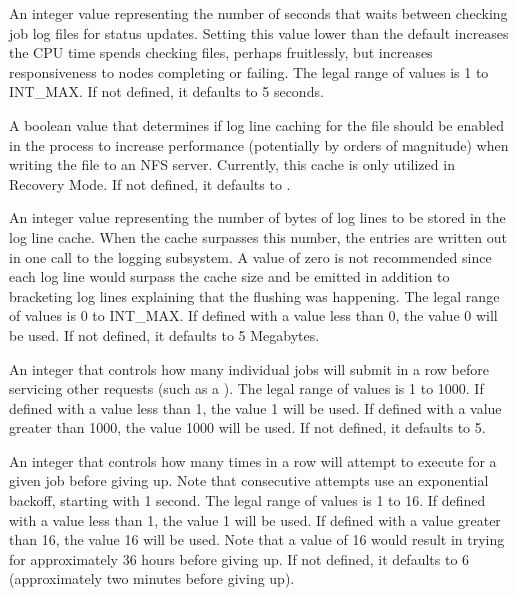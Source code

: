 \begin{description}

\label{param:DAGManUserLogScanInterval}
\item[\Macro{DAGMAN\_USER\_LOG\_SCAN\_INTERVAL}]
  An integer value representing the number of seconds that 
   waits between checking job log files for status updates.
  Setting this value lower than the default increases the CPU
  time  spends checking files, perhaps fruitlessly, but
  increases responsiveness to nodes completing or failing.
  The legal range of values is 1 to INT\_MAX.
  If not defined, it defaults to 5 seconds.

\label{param:DAGManDebugCacheEnable}
\item[\Macro{DAGMAN\_DEBUG\_CACHE\_ENABLE}]
  A boolean value that determines if log line caching for the 
  file should be enabled in the  process to increase
  performance (potentially by orders of magnitude) when writing the
   file to an NFS server. 
  Currently, this cache is only utilized in Recovery Mode.  
  If not defined, it defaults to .

\label{param:DAGManDebugCacheSize}
\item[\Macro{DAGMAN\_DEBUG\_CACHE\_SIZE}]
  An integer value representing the number of bytes of log lines to
  be stored in the log line cache. When the cache surpasses this number,
  the entries are written out in one call to the logging subsystem. A value of
  zero is not recommended since each log line would surpass the cache size 
  and be emitted in addition to bracketing log lines explaining that the 
  flushing was happening.
  The legal range of values is 0 to INT\_MAX.
  If defined with a value less than 0, the  value 0 will be used.
  If not defined, it defaults to 5 Megabytes.

\label{param:DAGManMaxSubmitsPerInterval}
\item[\Macro{DAGMAN\_MAX\_SUBMITS\_PER\_INTERVAL}]
  An integer that controls how many individual jobs
   will submit in a row
  before servicing other requests (such as a ).
  The legal range of values is 1 to 1000.
  If defined with a value less than 1, the  value 1 will be used.
  If defined with a value greater than 1000, the value 1000 will be used.
  If not defined, it defaults to 5.

\label{param:DAGManMaxSubmitAttempts}
\item[\Macro{DAGMAN\_MAX\_SUBMIT\_ATTEMPTS}]
  An integer that controls how
  many times in a row  will attempt to execute
   for a given job before giving up.
  Note that consecutive attempts use an exponential backoff,
  starting with 1 second.
  The legal range of values is 1 to 16.
  If defined with a value less than 1, the  value 1 will be used.
  If defined with a value greater than 16, the value 16 will be used.
  Note that a value of 16 would result in  trying for
  approximately 36 hours before giving up.
  If not defined,
  it defaults to 6 (approximately two minutes before giving up).


\end{description}
